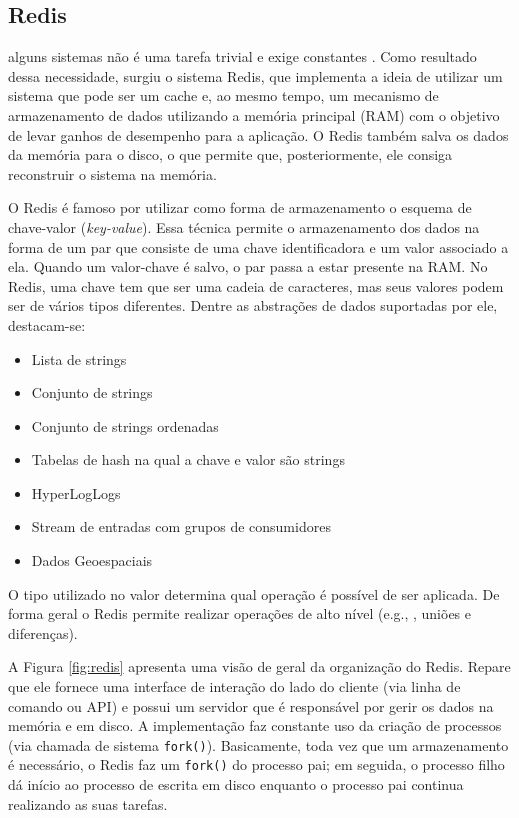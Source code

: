 \subsection{Redis}

 alguns sistemas não é uma tarefa trivial e exige constantes
. Como resultado dessa necessidade, surgiu o sistema Redis, que
implementa a ideia de utilizar um sistema que pode ser um cache e, ao mesmo tempo,
um mecanismo de armazenamento de dados utilizando a memória principal (RAM) com o objetivo
de levar ganhos de desempenho para a aplicação. O Redis também salva os dados
da memória para o disco, o que permite que, posteriormente, ele consiga
reconstruir o sistema na memória.

O Redis é famoso por utilizar como forma de armazenamento o esquema de
chave-valor (\emph{key-value}). Essa técnica permite o armazenamento dos dados na
forma de um par que consiste de uma chave identificadora e um valor associado a
ela. Quando um valor-chave é salvo, o par passa a estar presente na
RAM. No Redis, uma chave tem que ser uma cadeia de caracteres, mas seus valores podem ser de
vários tipos diferentes. Dentre as abstrações de dados suportadas por ele, destacam-se:

\begin{itemize}
  \item Lista de strings
  \item Conjunto de strings
  \item Conjunto de strings ordenadas
  \item Tabelas de hash na qual a chave e valor são strings
  \item HyperLogLogs
  \item Stream de entradas com grupos de consumidores
  \item Dados Geoespaciais
\end{itemize}

O tipo utilizado no valor determina qual operação é possível de ser aplicada.
De forma geral o Redis permite realizar operações de alto nível (e.g.,
, uniões e diferenças).

A Figura \ref{fig:redis} apresenta uma visão de geral da organização do Redis.
Repare que ele fornece uma interface de interação do lado do cliente (via
linha de comando ou API) e possui um servidor que é responsável por gerir os dados na memória e em disco.
A implementação faz constante uso da criação de processos (via
chamada de sistema \texttt{fork()}). Basicamente, toda vez que um armazenamento
é necessário, o Redis faz um \texttt{fork()} do processo pai; em seguida, o
processo filho dá início ao processo de escrita em disco enquanto o processo
pai continua realizando as suas tarefas. 

